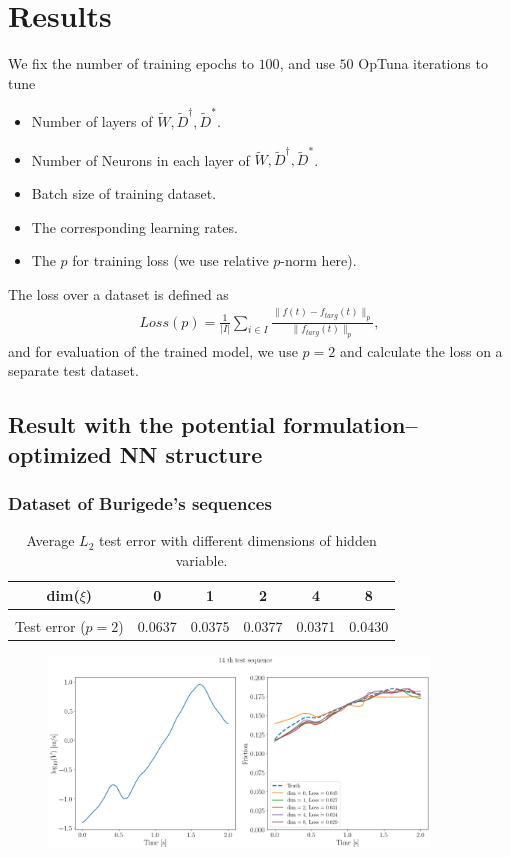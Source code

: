 \section{Results}
\noindent We fix the number of training epochs to $100$, 
and use $50$ OpTuna iterations to tune
\begin{itemize}
    \item Number of layers of $\tilde{W}, \tilde{D}^\dagger, \tilde{D}^*$.
    \item Number of Neurons in each layer of $\tilde{W}, \tilde{D}^\dagger, \tilde{D}^*$.
    \item Batch size of training dataset.
    \item The corresponding learning rates.
    \item The $p$ for training loss (we use relative $p$-norm here). 
\end{itemize}
The loss over a dataset is defined as 
\begin{align}
    Loss(p) = \frac{1}{|I|} \sum_{i\in I} \frac{\|f(t)-f_{targ}(t)\|_p}{\|f_{targ}(t)\|_p}, 
\end{align}
and for evaluation of the trained model, 
we use $p=2$ and calculate the loss on a separate test dataset. 

\newpage
\subsection{Result with the potential formulation--optimized NN structure}
\subsubsection{Dataset of Burigede's sequences}
\begin{table}[H]
    \centering
    \begin{tabular}{c|ccccc}
        \hline
        dim($\xi$) & 0 & 1 & 2 & 4 & 8 \\
        \hline \\[-1em]
        Test error ($p=2$) & 0.0637 & 0.0375 & 0.0377 & 0.0371 & 0.0430\\
        \hline
    \end{tabular}
    \caption{Average $L_2$ test error with different dimensions of hidden variable.}
    \label{tab:resDtTsqBurigede}
\end{table}

\begin{figure}[H]
    \centering
    \includegraphics[width=0.9\textwidth]{images/dtTSqBurigede1.png}
    \label{fig:dtTSqBurigede1}
\end{figure}

